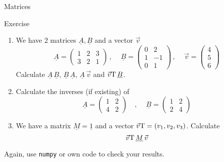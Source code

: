   \begin{frame}{Matrices}
    \begin{exampleblock}{Exercise}
      \begin{enumerate}
        \item We have 2 matrices $\underline{A}, \underline{B}$
          and a vector $\vec{v}$
          \begin{equation*}
            \underline{A} =
              \begin{pmatrix} 1 & 2 & 3 \\ 3 & 2 & 1 \end{pmatrix}
            \,\text{, }\quad
            \underline{B} =
              \begin{pmatrix} 0 & 2 \\ 1 & -1 \\ 0 & 1 \end{pmatrix}
            \,\text{, }\quad
            \vec{v} = \begin{pmatrix} 4 \\ 5 \\ 6 \end{pmatrix}
          \end{equation*}
          Calculate $\underline{A}\,\underline{B}$,
          $\underline{B}\,\underline{A}$,
          $\underline{A}\,\vec{v}$ and $\vec{v}\text{T}\,\underline{B}$.
        \item Calculate the inverses (if existing) of
          \begin{equation*}
            \underline{A} =
              \begin{pmatrix} 1 & 2 \\ 4 & 2 \end{pmatrix}
            \quad\text{, }\quad
            \underline{B} =
              \begin{pmatrix} 1 & 2 \\ 2 & 4 \end{pmatrix}
          \end{equation*}
        \item We have a matrix $\underline{M} = \underline{1}$
          and a vector $\vec{v}\text{T} = \left(v_1, v_2, v_3\right)$.
          Calculate
          \begin{equation*}
            \vec{v}\text{T}\, \underline{M}\, \vec{v}
          \end{equation*}
      \end{enumerate}
    Again, use \texttt{numpy} or own code to check your results.
    \end{exampleblock}
  \end{frame}

